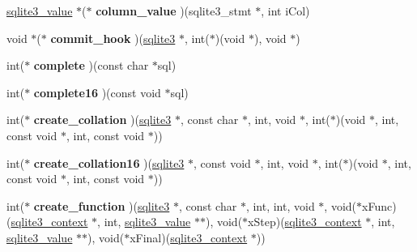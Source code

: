 \begin{DoxyCompactItemize}
\item 
\hyperlink{structMem}{sqlite3\+\_\+value} $\ast$($\ast$ {\bfseries column\+\_\+value} )(sqlite3\+\_\+stmt $\ast$, int i\+Col)\hypertarget{structsqlite3__api__routines_a051de47b5f1331319af6b6c9062e8b32}{}\label{structsqlite3__api__routines_a051de47b5f1331319af6b6c9062e8b32}

\item 
void $\ast$($\ast$ {\bfseries commit\+\_\+hook} )(\hyperlink{structsqlite3}{sqlite3} $\ast$, int($\ast$)(void $\ast$), void $\ast$)\hypertarget{structsqlite3__api__routines_a7a0ba7cc6db07bf2d0db7e0d5234095f}{}\label{structsqlite3__api__routines_a7a0ba7cc6db07bf2d0db7e0d5234095f}

\item 
int($\ast$ {\bfseries complete} )(const char $\ast$sql)\hypertarget{structsqlite3__api__routines_a4bd1a90b2a40c58ecc1c2ceb67be48f5}{}\label{structsqlite3__api__routines_a4bd1a90b2a40c58ecc1c2ceb67be48f5}

\item 
int($\ast$ {\bfseries complete16} )(const void $\ast$sql)\hypertarget{structsqlite3__api__routines_ae3e27f61b6c43cf549360f1bb8b3b591}{}\label{structsqlite3__api__routines_ae3e27f61b6c43cf549360f1bb8b3b591}

\item 
int($\ast$ {\bfseries create\+\_\+collation} )(\hyperlink{structsqlite3}{sqlite3} $\ast$, const char $\ast$, int, void $\ast$, int($\ast$)(void $\ast$, int, const void $\ast$, int, const void $\ast$))\hypertarget{structsqlite3__api__routines_aed840be5b7cc7add4f21ba88f1981f58}{}\label{structsqlite3__api__routines_aed840be5b7cc7add4f21ba88f1981f58}

\item 
int($\ast$ {\bfseries create\+\_\+collation16} )(\hyperlink{structsqlite3}{sqlite3} $\ast$, const void $\ast$, int, void $\ast$, int($\ast$)(void $\ast$, int, const void $\ast$, int, const void $\ast$))\hypertarget{structsqlite3__api__routines_a2f05772713bb942bff670352a96ee1e6}{}\label{structsqlite3__api__routines_a2f05772713bb942bff670352a96ee1e6}

\item 
int($\ast$ {\bfseries create\+\_\+function} )(\hyperlink{structsqlite3}{sqlite3} $\ast$, const char $\ast$, int, int, void $\ast$, void($\ast$x\+Func)(\hyperlink{structsqlite3__context}{sqlite3\+\_\+context} $\ast$, int, \hyperlink{structMem}{sqlite3\+\_\+value} $\ast$$\ast$), void($\ast$x\+Step)(\hyperlink{structsqlite3__context}{sqlite3\+\_\+context} $\ast$, int, \hyperlink{structMem}{sqlite3\+\_\+value} $\ast$$\ast$), void($\ast$x\+Final)(\hyperlink{structsqlite3__context}{sqlite3\+\_\+context} $\ast$))\hypertarget{structsqlite3__api__routines_aaf30781efad4fb70111f391e6fe20a9c}{}\label{structsqlite3__api__routines_aaf30781efad4fb70111f391e6fe20a9c}


\end{DoxyCompactItemize}
